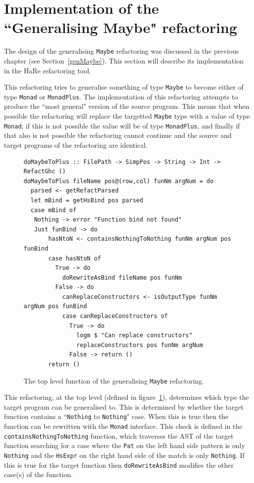 \section{Implementation of the ``Generalising Maybe" refactoring}
\label{sec:genMaybeImp}

The design of the generalising \texttt{Maybe} refactoring was discussed in the previous chapter (see Section~\ref{genMaybe}). This section will describe its implementation in the HaRe refactoring tool. 

This refactoring tries to generalise something of type \texttt{Maybe} to become either of type \texttt{Monad} or \texttt{MonadPlus}. The implementation of this refactoring attempts to produce the ``most general" version of the source program. This means that when possible the refactoring will replace the targetted \texttt{Maybe} type with a value of type \texttt{Monad}; if this is not possible the value will be of type \texttt{MonadPlus}, and finally if that also is not possible the refactoring cannot continue and the source and target programs of the refactoring are identical.

\begin{figure}[t]
\begin{lstlisting}
doMaybeToPlus :: FilePath -> SimpPos -> String -> Int -> RefactGhc ()  
doMaybeToPlus fileName pos@(row,col) funNm argNum = do
  parsed <- getRefactParsed
  let mBind = getHsBind pos parsed
  case mBind of
   Nothing -> error "Function bind not found"
   Just funBind -> do
       hasNtoN <- containsNothingToNothing funNm argNum pos funBind
       case hasNtoN of
         True -> do
           doRewriteAsBind fileName pos funNm
         False -> do 
           canReplaceConstructors <- isOutputType funNm argNum pos funBind
           case canReplaceConstructors of
             True -> do
               logm $ "Can replace constructors"
               replaceConstructors pos funNm argNum
             False -> return ()
       return ()
\end{lstlisting} 
\caption{The top level function of the generalising \texttt{Maybe} refactoring.}
\label{genMaybeTopLevel}
\end{figure}

This refactoring, at the top level (defined in figure~\ref{genMaybeTopLevel}), determines which type the target program can be generalised to. This is determined by whether the target function contains a ``\texttt{Nothing} to \texttt{Nothing}" case. When this is true then the function can be rewritten with the \texttt{Monad} interface. This check is defined in the \texttt{containsNothingToNothing} function, which traverses the AST of the target function searching for a case where the \texttt{Pat} on the left hand side pattern is only \texttt{Nothing} and the \texttt{HsExpr} on the right hand side of the match is only \texttt{Nothing}. If this is true for the target function then \texttt{doRewriteAsBind} modifies the other case(s) of the function.

